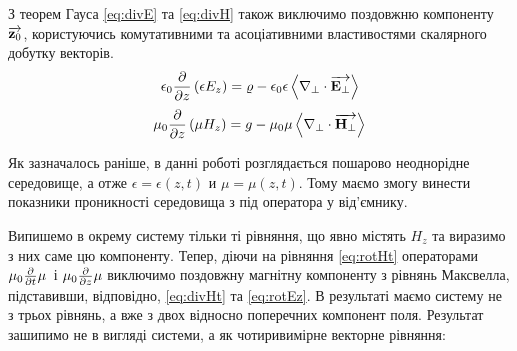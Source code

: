 З теорем Гауса \eqref{eq:divE} та \eqref{eq:divH} також виключимо 
поздовжню компоненту $ \overrightarrow{\mathbf z_0} $, користуючись комутативними та 
асоціативними властивостями скалярного добутку векторів.
%
%
\begin{equation} \label{eq:divEt} 
\epsilon_0 \frac{\partial }{\partial z} \left( \epsilon E_z \right) = 
\varrho - \epsilon_0 \epsilon \left< \nabla_\perp \cdot \overrightarrow{\mathbf E_\perp} \right>
\end{equation}
%
\begin{equation} \label{eq:divHt}
\mu_0 \frac{\partial }{\partial z} \left( \mu H_z \right) = 
g - \mu_0 \mu \left< \nabla_\perp \cdot \overrightarrow{\mathbf H_\perp} \right>
\end{equation}

Як зазначалось раніше, в данні роботі розглядається пошарово неоднорідне 
середовище, а отже $ \epsilon = \epsilon(z,t) $ и $ \mu = \mu(z,t) $. Тому
маємо змогу винести показники проникності середовища з під оператора у 
від'ємнику.

Випишемо в окрему систему тільки ті рівняння, що явно містять $ H_z $ та 
виразимо з них саме цю компоненту. Тепер, діючи на рівняння \eqref{eq:rotHt} 
операторами $ \mu_0 \frac{\partial }{\partial t} \mu $ і $ \mu_0 \frac{\partial }{\partial z} \mu $ 
виключимо поздовжну магнітну компоненту з рівнянь Максвелла, підставивши, 
відповідно, \eqref{eq:divHt} та \eqref{eq:rotEz}. В результаті маємо систему 
не з трьох рівнянь, а вже з двох відносно поперечних компонент поля. 
Результат зашипимо не в вигляді системи, а як чотиривимірне векторне рівняння:

